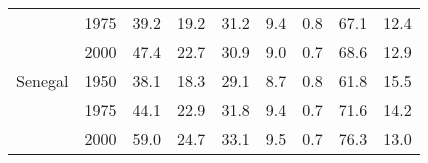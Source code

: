 \begin{longtable}[t]{llrrrrrrr}
\hspace{1em} & 1975 & 39.2 & 19.2 & 31.2 & 9.4 & 0.8 & 67.1 & 12.4\\
\hspace{1em} & 2000 & 47.4 & 22.7 & 30.9 & 9.0 & 0.7 & 68.6 & 12.9\\
\hspace{1em}Senegal & 1950 & 38.1 & 18.3 & 29.1 & 8.7 & 0.8 & 61.8 & 15.5\\
\hspace{1em} & 1975 & 44.1 & 22.9 & 31.8 & 9.4 & 0.7 & 71.6 & 14.2\\
\hspace{1em} & 2000 & 59.0 & 24.7 & 33.1 & 9.5 & 0.7 & 76.3 & 13.0\\*
\end{longtable}
